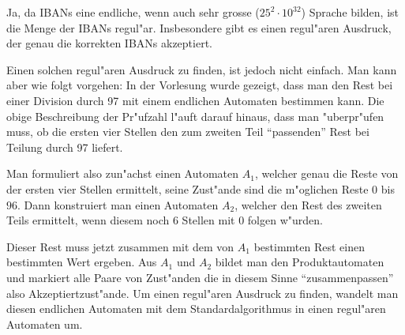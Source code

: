 \begin{loesung}
Ja, da IBANs eine endliche, wenn auch sehr grosse ($25^2\cdot 10^{32}$)
Sprache bilden, ist die Menge der IBANs regul"ar.
Insbesondere gibt es einen regul"aren Ausdruck, der genau die 
korrekten IBANs akzeptiert.

Einen solchen regul"aren Ausdruck zu finden, ist jedoch nicht einfach.
Man kann aber wie folgt vorgehen: In der Vorlesung wurde gezeigt,
dass man den Rest bei einer Division durch 97 mit einem endlichen
Automaten bestimmen kann. Die obige Beschreibung der Pr"ufzahl
l"auft darauf hinaus, dass man "uberpr"ufen muss, ob die ersten
vier Stellen den zum zweiten Teil ``passenden'' Rest bei Teilung
durch 97 liefert.

Man formuliert also zun"achst einen Automaten $A_1$,
welcher genau die Reste von der ersten vier Stellen ermittelt, seine
Zust"ande sind die m"oglichen Reste $0$ bis $96$.
Dann konstruiert man einen Automaten $A_2$, welcher den Rest 
des zweiten Teils ermittelt, wenn diesem noch 6 Stellen mit $0$
folgen w"urden.

Dieser Rest muss jetzt zusammen mit dem von $A_1$
bestimmten Rest einen bestimmten Wert ergeben. Aus $A_1$ und $A_2$ bildet
man den Produktautomaten und markiert alle Paare von Zust"anden die
in diesem Sinne ``zusammenpassen'' also Akzeptiertzust"ande.
Um einen regul"aren Ausdruck zu finden, wandelt man diesen endlichen
Automaten mit dem Standardalgorithmus in einen regul"aren Automaten
um.
\end{loesung}
